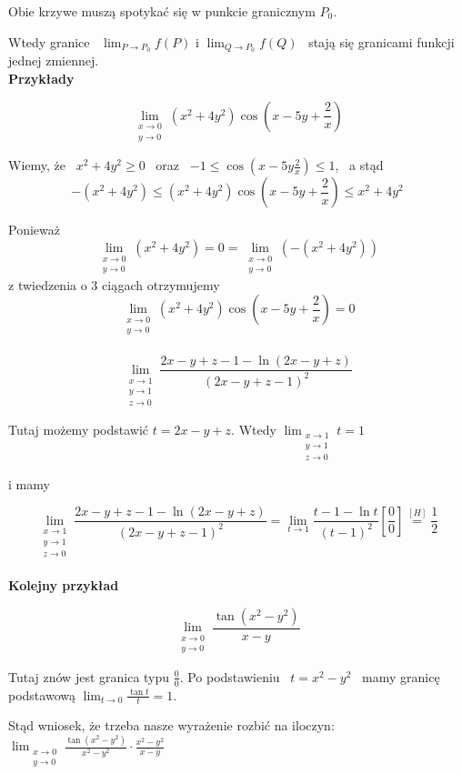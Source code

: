 Obie krzywe muszą spotykać się w punkcie granicznym $P_0$.

Wtedy granice \ $ \lim_{P \to P_0} f(P) $ \quad i \quad $ \lim_{Q \to P_0} f(Q) $ \ stają się granicami funkcji jednej zmiennej. \\

\textbf{Przykłady}

$$ \lim_{\substack{x \to 0 \\ y \to 0}} (x^2 + 4y^2) \cos \left( x - 5y + \frac{2}{x} \right) $$

Wiemy, że \ $ x^2 + 4y^2 \geq 0 $ \ oraz \ $ -1 \leq \cos \left( x - 5y \frac{2}{x} \right) \leq 1 $, \ a stąd
$$ -(x^2 + 4y^2) \leq (x^2 + 4y^2) \cos \left( x - 5y + \frac{2}{x} \right) \leq x^2 + 4y^2 $$

Ponieważ 
$$ \lim_{\substack{x \to 0 \\ y \to 0}} (x^2 + 4y^2) = 0 = \lim_{\substack{x \to 0 \\ y \to 0}} (-(x^2 + 4y^2)) $$
z twiedzenia o 3 ciągach otrzymujemy
$$ \lim_{\substack{x \to 0 \\ y \to 0}} (x^2 + 4y^2) \cos \left( x - 5y + \frac{2}{x} \right) = 0 $$ \\

$$ \lim_{\substack{x \to 1 \\ y \to 1 \\ z \to 0}} \frac{2x - y + z - 1 - \ln(2x - y + z)}{(2x - y + z - 1)^2} $$

Tutaj możemy podstawić $ t = 2x - y + z $. Wtedy $ \lim_{\substack{x \to 1 \\ y \to 1 \\ z \to 0}} t = 1 $

i mamy

$$ \lim_{\substack{x \to 1 \\ y \to 1 \\ z \to 0}} \frac{2x - y + z - 1 - \ln(2x - y + z)}{(2x - y + z - 1)^2}
= \lim_{t \to 1} \frac{t - 1 - \ln t}{(t-1)^2} \left[ \frac{0}{0} \right] \stackrel{[H]}{=} \frac{1}{2}$$ \\

\textbf{Kolejny przykład}

$$ \lim_{\substack{x \to 0 \\ y \to 0}} \frac{\tan (x^2 - y^2)}{x - y} $$

Tutaj znów jest granica typu $ \frac{0}{0} $. Po podstawieniu \ $ t = x^2 - y^2 $ \ mamy granicę podstawową
$ \lim_{t \to 0} \frac{\tan t}{t} = 1 $.

Stąd wniosek, że trzeba nasze wyrażenie rozbić na iloczyn: 
$ \lim_{\substack{x \to 0 \\ y \to 0}} \frac{\tan (x^2 - y^2)}{x^2 - y^2} \cdot \frac{x^2 - y^2}{x - y} $

